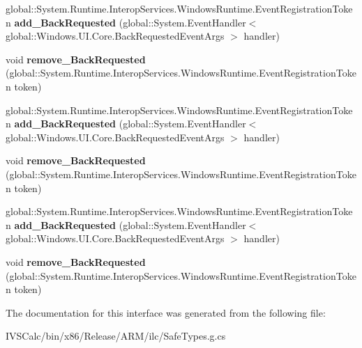 \begin{DoxyCompactItemize}
\item 
\mbox{\label{interface_windows_1_1_u_i_1_1_core_1_1_i_system_navigation_manager_a346f0983caf11773a17b0f1d18a0cc58}} 
global\+::\+System.\+Runtime.\+Interop\+Services.\+Windows\+Runtime.\+Event\+Registration\+Token {\bfseries add\+\_\+\+Back\+Requested} (global\+::\+System.\+Event\+Handler$<$ global\+::\+Windows.\+U\+I.\+Core.\+Back\+Requested\+Event\+Args $>$ handler)
\item 
\mbox{\label{interface_windows_1_1_u_i_1_1_core_1_1_i_system_navigation_manager_a1492875ba0a07be2510a20ee300185f2}} 
void {\bfseries remove\+\_\+\+Back\+Requested} (global\+::\+System.\+Runtime.\+Interop\+Services.\+Windows\+Runtime.\+Event\+Registration\+Token token)
\item 
\mbox{\label{interface_windows_1_1_u_i_1_1_core_1_1_i_system_navigation_manager_a346f0983caf11773a17b0f1d18a0cc58}} 
global\+::\+System.\+Runtime.\+Interop\+Services.\+Windows\+Runtime.\+Event\+Registration\+Token {\bfseries add\+\_\+\+Back\+Requested} (global\+::\+System.\+Event\+Handler$<$ global\+::\+Windows.\+U\+I.\+Core.\+Back\+Requested\+Event\+Args $>$ handler)
\item 
\mbox{\label{interface_windows_1_1_u_i_1_1_core_1_1_i_system_navigation_manager_a1492875ba0a07be2510a20ee300185f2}} 
void {\bfseries remove\+\_\+\+Back\+Requested} (global\+::\+System.\+Runtime.\+Interop\+Services.\+Windows\+Runtime.\+Event\+Registration\+Token token)
\item 
\mbox{\label{interface_windows_1_1_u_i_1_1_core_1_1_i_system_navigation_manager_a346f0983caf11773a17b0f1d18a0cc58}} 
global\+::\+System.\+Runtime.\+Interop\+Services.\+Windows\+Runtime.\+Event\+Registration\+Token {\bfseries add\+\_\+\+Back\+Requested} (global\+::\+System.\+Event\+Handler$<$ global\+::\+Windows.\+U\+I.\+Core.\+Back\+Requested\+Event\+Args $>$ handler)
\item 
\mbox{\label{interface_windows_1_1_u_i_1_1_core_1_1_i_system_navigation_manager_a1492875ba0a07be2510a20ee300185f2}} 
void {\bfseries remove\+\_\+\+Back\+Requested} (global\+::\+System.\+Runtime.\+Interop\+Services.\+Windows\+Runtime.\+Event\+Registration\+Token token)
\end{DoxyCompactItemize}


The documentation for this interface was generated from the following file\+:\begin{DoxyCompactItemize}
\item 
I\+V\+S\+Calc/bin/x86/\+Release/\+A\+R\+M/ilc/Safe\+Types.\+g.\+cs\end{DoxyCompactItemize}
